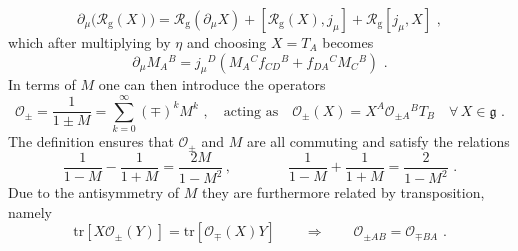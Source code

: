 \documentclass[12pt]{article}
\numberwithin{equation}{section}
\begin{document}
\begin{equation}
\partial_{\mu} \bigl(\mathcal{R}_{\mathrm{g}}(X) \bigr) = \mathcal{R}_{\mathrm{g}}(\partial_{\mu}X) + [\mathcal{R}_{\mathrm{g}}(X),j_{\mu}]+\mathcal{R}_{\mathrm{g}}[j_{\mu},X] \,\, ,
\end{equation}
which after multiplying by $\eta$ and choosing $X=T_{A}$ becomes
\begin{equation}\label{M-derivative-components}
\partial_{\mu}M_{A}{}^{B}=j_{\mu}{}^{D}(M_{A}{}^{C}f_{CD}{}^{B}+f_{DA}{}^{C}M_{C}{}^{B}) \,\, .
\end{equation}
In terms of $M$ one can then introduce the operators
\begin{equation}
\mathcal{O}_{\pm}=\frac{1}{1\pm M}=\sum_{k=0}^{\infty}(\mp)^k
M^k \,\, , 
\quad \text{acting as} \quad \mathcal{O}_{\pm}(X)=X^{A}\mathcal{O}_{\pm A}{}^{B}T_{B} \quad \forall \, X\in \mathfrak{g} \,\, .
\end{equation}
The definition ensures that $\mathcal{O}_{\pm}$ and $M$ are all commuting and satisfy the relations
\begin{equation}\label{sum-difference-Opm}
\frac{1}{1-M}-\frac{1}{1+M}=\frac{2M}{1-M^2} \, ,
\qquad 
\qquad 
\frac{1}{1-M}+\frac{1}{1+M}=\frac{2}{1-M^2} \,\, .
\end{equation}
Due to the antisymmetry of $M$ they are furthermore related by transposition, namely
\begin{equation}
\mathrm{tr}[X\mathcal{O}_{\pm}(Y)]=\mathrm{tr}[\mathcal{O}_{\mp}(X)Y] 
\qquad \Longrightarrow \qquad
\mathcal{O}_{\pm AB}=\mathcal{O}_{\mp BA} \,\, .
\end{equation}
\end{document}

